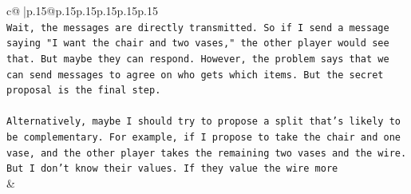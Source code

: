 \documentclass{article}
\begin{document}
{\begin{supertabular}{c@{$\;$}|p{.15\linewidth}@{}p{.15\linewidth}p{.15\linewidth}p{.15\linewidth}p{.15\linewidth}p{.15\linewidth}}
{{{\\ 
\texttt{Wait, the messages are directly transmitted. So if I send a message saying "I want the chair and two vases," the other player would see that. But maybe they can respond. However, the problem says that we can send messages to agree on who gets which items. But the secret proposal is the final step.} \\
\\ 
\texttt{Alternatively, maybe I should try to propose a split that's likely to be complementary. For example, if I propose to take the chair and one vase, and the other player takes the remaining two vases and the wire. But I don't know their values. If they value the wire more} \\
            }
        }
    }
    & \\ \\


\end{supertabular}}
\end{document}
